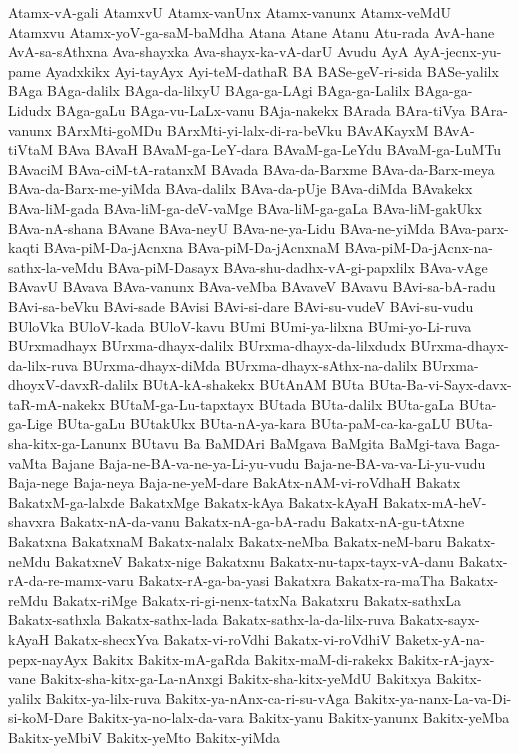 {Atamx-vA-gali
AtamxvU
Atamx-vanUnx
Atamx-vanunx
Atamx-veMdU
Atamxvu
Atamx-yoV-ga-saM-baMdha
Atana
Atane
Atanu
Atu-rada
AvA-hane
AvA-sa-sAthxna
Ava-shayxka
Ava-shayx-ka-vA-darU
Avudu
AyA
AyA-jecnx-yu-pame
Ayadxkikx
Ayi-tayAyx
Ayi-teM-dathaR
BA
BASe-geV-ri-sida
BASe-yalilx
BAga
BAga-dalilx
BAga-da-lilxyU
BAga-ga-LAgi
BAga-ga-Lalilx
BAga-ga-Lidudx
BAga-gaLu
BAga-vu-LaLx-vanu
BAja-nakekx
BArada
BAra-tiVya
BAra-vanunx
BArxMti-goMDu
BArxMti-yi-lalx-di-ra-beVku
BAvAKayxM
BAvA-tiVtaM
BAva
BAvaH
BAvaM-ga-LeY-dara
BAvaM-ga-LeYdu
BAvaM-ga-LuMTu
BAvaciM
BAva-ciM-tA-ratanxM
BAvada
BAva-da-Barxme
BAva-da-Barx-meya
BAva-da-Barx-me-yiMda
BAva-dalilx
BAva-da-pUje
BAva-diMda
BAvakekx
BAva-liM-gada
BAva-liM-ga-deV-vaMge
BAva-liM-ga-gaLa
BAva-liM-gakUkx
BAva-nA-shana
BAvane
BAva-neyU
BAva-ne-ya-Lidu
BAva-ne-yiMda
BAva-parx-kaqti
BAva-piM-Da-jAcnxna
BAva-piM-Da-jAcnxnaM
BAva-piM-Da-jAcnx-na-sathx-la-veMdu
BAva-piM-Dasayx
BAva-shu-dadhx-vA-gi-papxlilx
BAva-vAge
BAvavU
BAvava
BAva-vanunx
BAva-veMba
BAvaveV
BAvavu
BAvi-sa-bA-radu
BAvi-sa-beVku
BAvi-sade
BAvisi
BAvi-si-dare
BAvi-su-vudeV
BAvi-su-vudu
BUloVka
BUloV-kada
BUloV-kavu
BUmi
BUmi-ya-lilxna
BUmi-yo-Li-ruva
BUrxmadhayx
BUrxma-dhayx-dalilx
BUrxma-dhayx-da-lilxdudx
BUrxma-dhayx-da-lilx-ruva
BUrxma-dhayx-diMda
BUrxma-dhayx-sAthx-na-dalilx
BUrxma-dhoyxV-davxR-dalilx
BUtA-kA-shakekx
BUtAnAM
BUta
BUta-Ba-vi-Sayx-davx-taR-mA-nakekx
BUtaM-ga-Lu-tapxtayx
BUtada
BUta-dalilx
BUta-gaLa
BUta-ga-Lige
BUta-gaLu
BUtakUkx
BUta-nA-ya-kara
BUta-paM-ca-ka-gaLU
BUta-sha-kitx-ga-Lanunx
BUtavu
Ba
BaMDAri
BaMgava
BaMgita
BaMgi-tava
Baga-vaMta
Bajane
Baja-ne-BA-va-ne-ya-Li-yu-vudu
Baja-ne-BA-va-va-Li-yu-vudu
Baja-nege
Baja-neya
Baja-ne-yeM-dare
BakAtx-nAM-vi-roVdhaH
Bakatx
BakatxM-ga-lalxde
BakatxMge
Bakatx-kAya
Bakatx-kAyaH
Bakatx-mA-heV-shavxra
Bakatx-nA-da-vanu
Bakatx-nA-ga-bA-radu
Bakatx-nA-gu-tAtxne
Bakatxna
BakatxnaM
Bakatx-nalalx
Bakatx-neMba
Bakatx-neM-baru
Bakatx-neMdu
BakatxneV
Bakatx-nige
Bakatxnu
Bakatx-nu-tapx-tayx-vA-danu
Bakatx-rA-da-re-mamx-varu
Bakatx-rA-ga-ba-yasi
Bakatxra
Bakatx-ra-maTha
Bakatx-reMdu
Bakatx-riMge
Bakatx-ri-gi-nenx-tatxNa
Bakatxru
Bakatx-sathxLa
Bakatx-sathxla
Bakatx-sathx-lada
Bakatx-sathx-la-da-lilx-ruva
Bakatx-sayx-kAyaH
Bakatx-shecxYva
Bakatx-vi-roVdhi
Bakatx-vi-roVdhiV
Baketx-yA-na-pepx-nayAyx
Bakitx
Bakitx-mA-gaRda
Bakitx-maM-di-rakekx
Bakitx-rA-jayx-vane
Bakitx-sha-kitx-ga-La-nAnxgi
Bakitx-sha-kitx-yeMdU
Bakitxya
Bakitx-yalilx
Bakitx-ya-lilx-ruva
Bakitx-ya-nAnx-ca-ri-su-vAga
Bakitx-ya-nanx-La-va-Di-si-koM-Dare
Bakitx-ya-no-lalx-da-vara
Bakitx-yanu
Bakitx-yanunx
Bakitx-yeMba
Bakitx-yeMbiV
Bakitx-yeMto
Bakitx-yiMda
}
